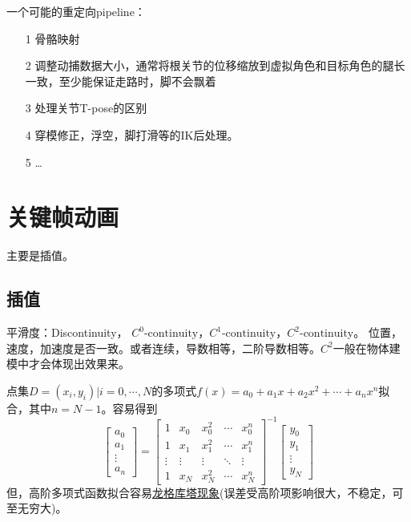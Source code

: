 \documentclass[lang=cn,newtx,10pt,scheme=chinese]{elegantbook}
\begin{document}
一个可能的重定向pipeline：
\begin{itemize}
  \setlength{\itemindent}{2em} 
  \item[1] 骨骼映射
  \item[2] 调整动捕数据大小，通常将根关节的位移缩放到虚拟角色和目标角色的腿长一致，至少能保证走路时，脚不会飘着
  \item[3] 处理关节T-pose的区别
  \item[4] 穿模修正，浮空，脚打滑等的IK后处理。
  \item[5] \dots 
\end{itemize}

\section{关键帧动画}
主要是插值。

\subsection{插值}
平滑度：Discontinuity， $C^{0}\text{-continuity}$，$C^{1}\text{-continuity}$，$C^{2}\text{-continuity}$。
位置，速度，加速度是否一致。或者连续，导数相等，二阶导数相等。$C^2$一般在物体建模中才会体现出效果来。

点集$D={(x_i, y_i)|i=0, \cdots, N }$的多项式$f(x)=a_0 + a_1 x + a_2 x^2 + 
\cdots + a_n x^n$拟合，其中$n=N-1$。容易得到
\begin{equation}
  \left[\begin{array}{c}
  a_0 \\
  a_1 \\
  \vdots \\
  a_n
  \end{array}\right]=\left[\begin{array}{ccccc}
  1 & x_0 & x_0^2 & \cdots & x_0^n \\
  1 & x_1 & x_1^2 & \cdots & x_1^n \\
  \vdots & \vdots & \vdots & \ddots & \vdots \\
  1 & x_N & x_N^2 & \cdots & x_N^n
  \end{array}\right]^{-1}\left[\begin{array}{c}
  y_0 \\
  y_1 \\
  \vdots \\
  y_N
  \end{array}\right]
\end{equation}
但，高阶多项式函数拟合容易\href{https://personal.math.ubc.ca/~peirce/M406_Lecture_3_Runge_Phenomenon_Piecewise_Polynomial_Interpolation.pdf}{龙格库塔现象}(误差受高阶项影响很大，不稳定，可至无穷大)。
\end{document}
